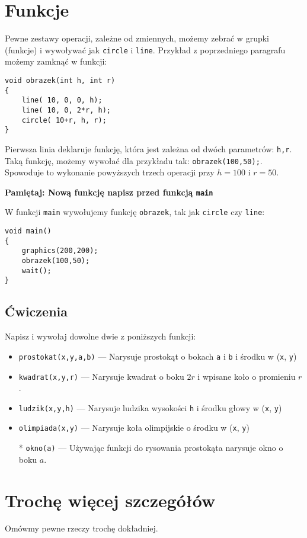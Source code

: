 \documentclass{instrukcja}
\begin{document}
\author{\L{}. \L{}aniewski-Wo\l{}\l{}k}
\materialtitle

\section{Funkcje}
Pewne zestawy operacji, zależne od zmiennych, możemy zebrać w grupki (funkcje) i wywoływać jak {\tt circle} i {\tt line}. Przykład z poprzedniego paragrafu możemy zamknąć w funkcji:
\begin{verbatim}
void obrazek(int h, int r)
{
    line( 10, 0, 0, h);
    line( 10, 0, 2*r, h);
    circle( 10+r, h, r);
}
\end{verbatim}

Pierwsza linia deklaruje funkcję, która jest zależna od dwóch parametrów: {\tt h,r}. Taką funkcję, możemy wywołać dla przykładu tak: {\tt obrazek(100,50);}. Spowoduje to wykonanie powyższych trzech operacji przy $h=100$ i $r=50$.

{\bf {\red Pamiętaj:} Nową funkcję napisz przed funkcją {\tt main}}

W funkcji {\tt main} wywołujemy funkcję {\tt obrazek}, tak jak {\tt circle} czy {\tt line}:
\begin{verbatim}
void main()
{
    graphics(200,200);
    obrazek(100,50);	
    wait();
}
\end{verbatim}

\subsection*{Ćwiczenia}
Napisz i wywołaj dowolne dwie z poniższych funkcji:
\begin{itemize}
\item {\tt prostokat(x,y,a,b)} --- Narysuje prostokąt o bokach {\tt a} i {\tt b} i środku w ({\tt x}, {\tt y})
\item {\tt kwadrat(x,y,r)} --- Narysuje kwadrat o boku $2r$ i wpisane koło o promieniu $r$.
\item {\tt ludzik(x,y,h)} --- Narysuje ludzika wysokości {\tt h} i środku głowy w ({\tt x}, {\tt y})
\item {\tt olimpiada(x,y)} --- Narysuje koła olimpijskie o środku w ({\tt x}, {\tt y})
\item[*] {\tt okno(a)} --- Używając funkcji do rysowania prostokąta narysuje okno o boku $a$.
\end{itemize}

\section{Trochę więcej szczegółów}
Omówmy pewne rzeczy trochę dokładniej.
\end{document}
